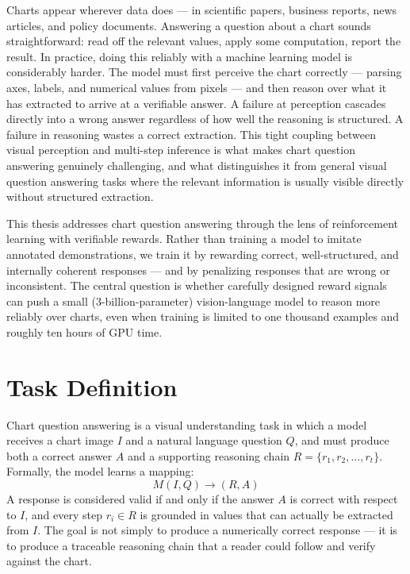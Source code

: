 \documentclass{iutbscthesis}
\begin{document}
Charts appear wherever data does --- in scientific papers, business reports, news articles, and policy documents. Answering a question about a chart sounds straightforward: read off the relevant values, apply some computation, report the result. In practice, doing this reliably with a machine learning model is considerably harder. The model must first perceive the chart correctly --- parsing axes, labels, and numerical values from pixels --- and then reason over what it has extracted to arrive at a verifiable answer. A failure at perception cascades directly into a wrong answer regardless of how well the reasoning is structured. A failure in reasoning wastes a correct extraction. This tight coupling between visual perception and multi-step inference is what makes chart question answering genuinely challenging, and what distinguishes it from general visual question answering tasks where the relevant information is usually visible directly without structured extraction.

This thesis addresses chart question answering through the lens of reinforcement learning with verifiable rewards. Rather than training a model to imitate annotated demonstrations, we train it by rewarding correct, well-structured, and internally coherent responses --- and by penalizing responses that are wrong or inconsistent. The central question is whether carefully designed reward signals can push a small (3-billion-parameter) vision-language model to reason more reliably over charts, even when training is limited to one thousand examples and roughly ten hours of GPU time.

\section{Task Definition}

Chart question answering is a visual understanding task in which a model receives a chart image $I$ and a natural language question $Q$, and must produce both a correct answer $A$ and a supporting reasoning chain $R = \{r_1, r_2, \ldots, r_t\}$. Formally, the model learns a mapping:
\begin{equation}
    M(I, Q) \rightarrow (R, A)
\end{equation}
A response is considered valid if and only if the answer $A$ is correct with respect to $I$, and every step $r_i \in R$ is grounded in values that can actually be extracted from $I$. The goal is not simply to produce a numerically correct response --- it is to produce a traceable reasoning chain that a reader could follow and verify against the chart.
\end{document}
